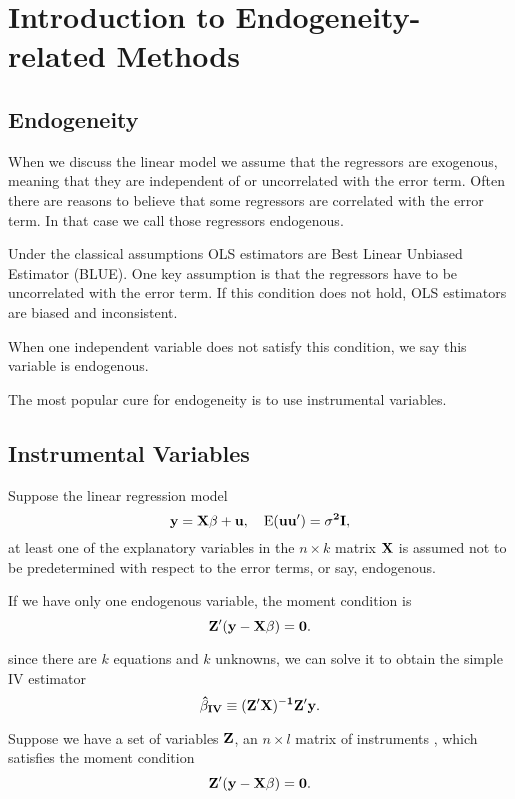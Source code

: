 \chapter{Introduction to Endogeneity-related Methods}

\section{Endogeneity}

When we discuss the linear model we assume that the regressors are
exogenous, meaning that they are independent of or uncorrelated with
the error term.  Often there are reasons to believe that some
regressors are correlated with the error term.  In that case we call
those regressors endogenous.


Under the classical assumptions OLS estimators are Best Linear
Unbiased Estimator (BLUE).  One key assumption is that the regressors
have to be uncorrelated with the error term.  If this condition does
not hold, OLS estimators are biased and inconsistent.

When one independent variable does not satisfy this condition, we say
this variable is endogenous.

The most popular cure for endogeneity is to use instrumental variables.

\section{Instrumental Variables}

Suppose the linear regression model
\begin{equation}
\bf y=X\beta+u, \quad {\rm E} (u u')=\sigma^2 I, \label{eqn:iv}
\end{equation}
 at least one of the explanatory variables in the $n \times k$
matrix $\bf X$ is assumed not to be predetermined with respect to the
error terms, or say, endogenous.


If we have only one endogenous variable, the moment condition is
\begin{equation}
\bf Z'(y-X\beta)=0.
\end{equation}

since there are $k$ equations and $k$ unknowns, we can solve it to
obtain the simple IV estimator
\begin{equation}
\bf \hat \beta_{IV} \equiv (Z'X)^{-1}Z'y.
\end{equation}

Suppose we have a set of  variables $\bf Z$, an $n \times l$
matrix of instruments , which satisfies the moment
condition
\begin{equation}
\bf Z'(y-X\beta)=0.
\end{equation}

